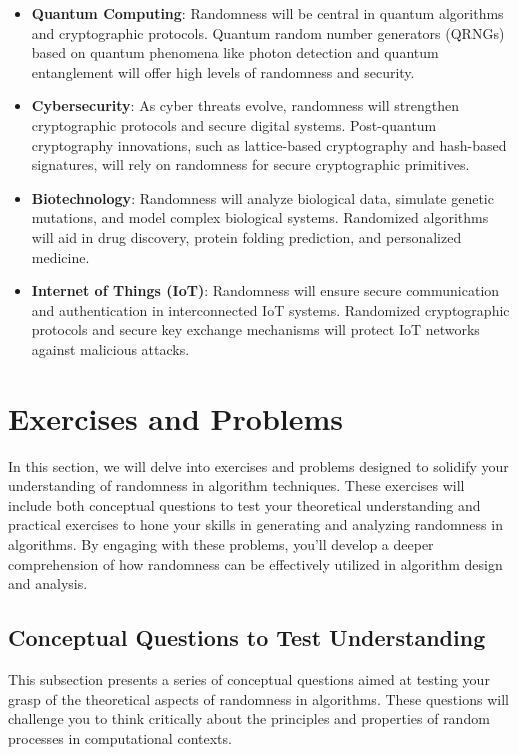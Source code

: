 \documentclass[12pt]{book} %
\begin{document}
\begin{itemize}
    \item \textbf{Quantum Computing}: Randomness will be central in quantum algorithms and cryptographic protocols. Quantum random number generators (QRNGs) based on quantum phenomena like photon detection and quantum entanglement will offer high levels of randomness and security.
    
    \item \textbf{Cybersecurity}: As cyber threats evolve, randomness will strengthen cryptographic protocols and secure digital systems. Post-quantum cryptography innovations, such as lattice-based cryptography and hash-based signatures, will rely on randomness for secure cryptographic primitives.
    
    \item \textbf{Biotechnology}: Randomness will analyze biological data, simulate genetic mutations, and model complex biological systems. Randomized algorithms will aid in drug discovery, protein folding prediction, and personalized medicine.
    
    \item \textbf{Internet of Things (IoT)}: Randomness will ensure secure communication and authentication in interconnected IoT systems. Randomized cryptographic protocols and secure key exchange mechanisms will protect IoT networks against malicious attacks.
\end{itemize}

\section{Exercises and Problems}
In this section, we will delve into exercises and problems designed to solidify your understanding of randomness in algorithm techniques. These exercises will include both conceptual questions to test your theoretical understanding and practical exercises to hone your skills in generating and analyzing randomness in algorithms. By engaging with these problems, you'll develop a deeper comprehension of how randomness can be effectively utilized in algorithm design and analysis.

\subsection{Conceptual Questions to Test Understanding}
This subsection presents a series of conceptual questions aimed at testing your grasp of the theoretical aspects of randomness in algorithms. These questions will challenge you to think critically about the principles and properties of random processes in computational contexts.
\end{document}
